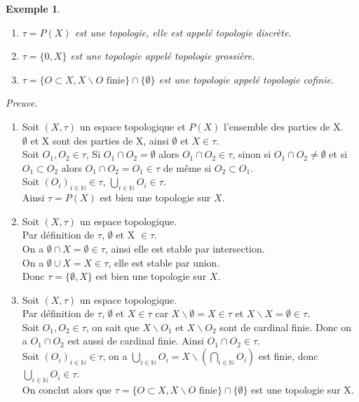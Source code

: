 \documentclass[a4paper, 12pt]{report}
\theoremstyle{break}
\newtheorem{exe}[defin]{Exemple}
\begin{document}
\begin{exe}
	\begin{enumerate}
		\item $\tau = P(X)$ est une topologie, elle est appelé topologie discrète.
		\item $\tau = \{0, X\}$ est une topologie appelé topologie grossière.
		\item $\tau = \{ O \subset X, X \backslash O \mbox{ finie}\} \cap \{ \emptyset \}$ est une topologie appelé topologie cofinie.
	\end{enumerate}
\end{exe}
\textit{Preuve.}
\begin{enumerate}
	\item Soit $(X, \tau)$ un espace topologique et $P(X)$ l'ensemble des parties de X.\\
	$\emptyset$ et X sont des parties de X, ainsi $\emptyset$ et $X \in \tau$.\\
	Soit $O_{1}, O_{2} \in \tau$, Si $O_{1} \cap O_{2} = \emptyset$ alors $O_{1} \cap O_{2} \in \tau$, sinon si $O_{1} \cap O_{2} \not= \emptyset$ et si $O_{1} \subset O_{2}$ alors $O_{1} \cap O_{2} = O_{1} \in \tau$ de même si $O_{2} \subset O_{1}$.\\
	Soit $(O_{i})_{i \in \mathbb{N}} \in \tau$, $\bigcup_{i \in \mathbb{N}} O_{i} \in \tau$.\\
	Ainsi $\tau = P(X)$ est bien une topologie sur $X$.

	\item Soit $(X, \tau)$ un espace topologique.\\
	Par définition de $\tau$, $\emptyset$ et X $\in \tau$.\\
	On a $\emptyset \cap X = \emptyset \in \tau$, ainsi elle est stable par intersection.\\
	On a $\emptyset \cup X = X \in \tau$, elle est stable par union.\\
	Donc $\tau = \{ \emptyset, X\}$ est bien une topologie sur $X$.
	\item Soit $(X, \tau)$ un espace topologique.\\
	Par définition de $\tau$, $\emptyset$ et $X \in \tau$ car $X\backslash \emptyset = X \in \tau$ et $X\backslash X = \emptyset \in \tau$.\\
	Soit $O_{1}, O_{2} \in \tau$, on sait que $X\backslash O_{1}$ et $X \backslash O_{2}$ sont de cardinal finie. Donc on a $O_{1} \cap O_{2}$ est aussi de cardinal finie. Ainsi $O_{1} \cap O_{2} \in \tau$.\\
		Soit $(O_{i})_{i \in \mathbb{N}} \in \tau$, on a $\bigcup_{i \in \mathbb{N}} O_{i} = X \backslash (\bigcap_{i \in \mathbb{N}} O_{i})$ est finie, donc $\bigcup_{i \in \mathbb{N}} O_{i} \in \tau$.\\
	On conclut alors que $\tau = \{ O \subset X, X \backslash O \mbox{ finie}\} \cap \{ \emptyset \}$ est une topologie sur X. \marginpar{$\square$}
\end{enumerate}
\end{document}
